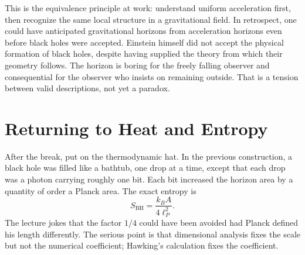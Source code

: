 \begin{classroomqa}
\end{classroomqa}

This is the equivalence principle at work: understand uniform acceleration first, then recognize the same local structure in a gravitational field. In retrospect, one could have anticipated gravitational horizons from acceleration horizons even before black holes were accepted. Einstein himself did not accept the physical formation of black holes, despite having supplied the theory from which their geometry follows. The horizon is boring for the freely falling observer and consequential for the observer who insists on remaining outside. That is a tension between valid descriptions, not yet a paradox.

\section{Returning to Heat and Entropy}

After the break, put on the thermodynamic hat. In the previous construction, a black hole was filled like a bathtub, one drop at a time, except that each drop was a photon carrying roughly one bit. Each bit increased the horizon area by a quantity of order a Planck area. The exact entropy is
\begin{equation}
S_{\mathrm{BH}}=\frac{k_B A}{4\ell_P^2}.
\end{equation}
The lecture jokes that the factor \(1/4\) could have been avoided had Planck defined his length differently. The serious point is that dimensional analysis fixes the scale but not the numerical coefficient; Hawking's calculation fixes the coefficient.

